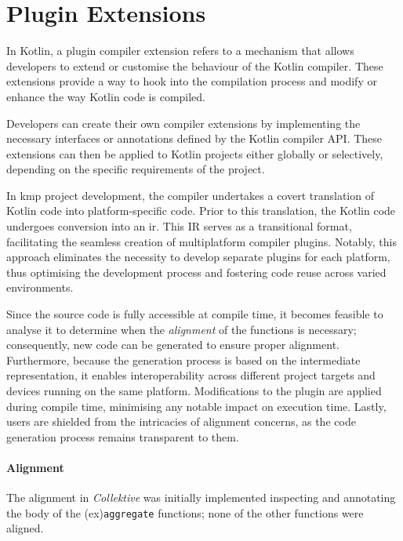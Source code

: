 \section{Plugin Extensions}
\label{sec:plugin-extensions}
In Kotlin, a plugin compiler extension refers to a mechanism that allows developers to extend or customise the behaviour
of the Kotlin compiler.
These extensions provide a way to hook into the compilation process and modify or enhance the way Kotlin code is compiled.

Developers can create their own compiler extensions by implementing the necessary interfaces or annotations defined by
the Kotlin compiler API.
These extensions can then be applied to Kotlin projects either globally or selectively, depending on the specific
requirements of the project.

In \ac{kmp} project development, the compiler undertakes a covert translation of Kotlin code into platform-specific code.
Prior to this translation, the Kotlin code undergoes conversion into an \ac{ir}.
This IR serves as a transitional format, facilitating the seamless creation of multiplatform compiler plugins.
Notably, this approach eliminates the necessity to develop separate plugins for each platform, thus optimising the
development process and fostering code reuse across varied environments.

Since the source code is fully accessible at compile time, it becomes feasible to analyse it to determine when the \emph{alignment}
of the functions is necessary; consequently, new code can be generated to ensure proper alignment.
Furthermore, because the generation process is based on the intermediate representation, it enables interoperability across
different project targets and devices running on the same platform.
Modifications to the plugin are applied during compile time, minimising any notable impact on execution time.
Lastly, users are shielded from the intricacies of alignment concerns, as the code generation process remains transparent to them.


\paragraph{Alignment}
\label{par:alignment}

The alignment in \emph{Collektive} was initially implemented inspecting and annotating the body of the (ex)\texttt{aggregate} functions;
none of the other functions were aligned.

